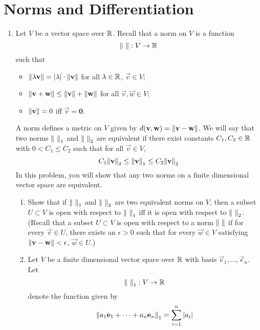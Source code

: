 \documentclass[../psets.tex]{subfiles}
\begin{document}
\section{Norms and Differentiation}
\begin{enumerate}
    \item {}Let $V$ be a vector space over $\mathbb{R}$. Recall that a norm on $V$ is a function
    \begin{equation*}
        \norm{\ }:V\to\mathbb{R}
    \end{equation*}
    such that
    \begin{itemize}
        \item $\norm{\lambda\mathbf{v}}=|\lambda|\cdot\norm{\mathbf{v}}$ for all $\lambda\in\mathbb{R}$, $\vec{v}\in V$;
        \item $\norm{\mathbf{v}+\mathbf{w}}\leq\norm{\mathbf{v}}+\norm{\mathbf{w}}$ for all $\vec{v},\vec{w}\in V$;
        \item $\norm{\mathbf{v}}=0$ iff $\vec{v}=\bm{0}$.
    \end{itemize}
    A norm defines a metric on $V$ given by $d(\mathbf{v},\mathbf{w})=\norm{\mathbf{v}-\mathbf{w}}$. We will say that two norms $\norm{\ }_1$ and $\norm{\ }_2$ are equivalent if there exist constants $C_1,C_2\in\mathbb{R}$ with $0<C_1\leq C_2$ such that for all $\vec{v}\in V$,
    \begin{equation*}
        C_1\norm{\mathbf{v}}_2 \leq \norm{\mathbf{v}}_1 \leq C_2\norm{\mathbf{v}}_2
    \end{equation*}
    In this problem, you will show that any two norms on a finite dimensional vector space are equivalent.
    \begin{enumerate}
        \item Show that if $\norm{\ }_1$ and $\norm{\ }_2$ are two equivalent norms on $V$, then a subset $U\subset V$ is open with respect to $\norm{\ }_1$ iff it is open with respect to $\norm{\ }_2$. (Recall that a subset $U\subset V$ is open with respect to a norm $\norm{\ }$ if for every $\vec{v}\in U$, there exists an $\epsilon>0$ such that for every $\vec{w}\in V$ satisfying $\norm{\mathbf{v}-\mathbf{w}}<\epsilon$, $\vec{w}\in U$.)
        \item Let $V$ be a finite dimensional vector space over $\mathbb{R}$ with basis $\vec{e}_1,\dots,\vec{e}_n$. Let
        \begin{equation*}
            \norm{\ }_1:V\to\mathbb{R}
        \end{equation*}
        denote the function given by
        \begin{equation*}
            \norm{a_1\vec{e}_1+\cdots+a_n\vec{e}_n}_1 = \sum_{i=1}^n|a_i|

\end{equation*}
\end{enumerate}
\end{enumerate}
\end{document}
